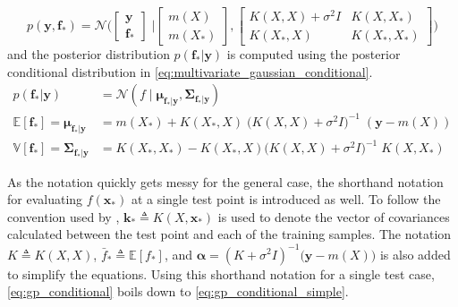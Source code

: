 \begin{equation}
    p(\boldsymbol{y}, \boldsymbol{f}_*) = \mathcal{N}\bigg(\begin{bmatrix}
        \boldsymbol{y} \\ \boldsymbol{f}_*
    \end{bmatrix} \; \bigg| \begin{bmatrix}
        m(X) \\ m(X_*)
    \end{bmatrix},  \begin{bmatrix}
        K(X, X) + \sigma^2 I & K(X, X_*) \\ K(X_*, X) & K(X_*, X_*)
    \end{bmatrix}\bigg)
\end{equation}
and the posterior distribution $p(\boldsymbol{f}_* | \boldsymbol{y})$ is computed using the posterior conditional distribution in \cref{eq:multivariate_gaussian_conditional}.
\begin{subequations}\label{eq:gp_conditional}
\begin{align}
    p(\boldsymbol{f}_* | \boldsymbol{y}) &= \mathcal{N}(f \; | \; \boldsymbol{\mu}_{\boldsymbol{f}_*|\boldsymbol{y}}, \boldsymbol{\Sigma}_{\boldsymbol{f}_*|\boldsymbol{y}})\\
    \mathbb{E}[\boldsymbol{f}_*] =  \boldsymbol{\mu}_{\boldsymbol{f}_* | \boldsymbol{y}} &= m(X_*) + K(X_*, X) \; \big(K(X, X) + \sigma^2 I\big)^{-1} \; (\boldsymbol{y} - m(X))\label{eq:gp_conditional_mean}\\
    \mathbb{V}[\boldsymbol{f}_*] = \boldsymbol{\Sigma}_{\boldsymbol{f}_* | \boldsymbol{y}} &= K(X_*, X_*) - K(X_*, X)  \big(K(X, X) + \sigma^2 I\big)^{-1} \; K(X, X_*)\label{eq:gp_conditional_var}
\end{align}
\end{subequations}

As the notation quickly gets messy for the general case, the shorthand notation for evaluating $f(\boldsymbol{x}_*)$ at a single test point is introduced as well. To follow the convention used by \cite{rasmussen}, $\boldsymbol{k}_* \triangleq K(X, \boldsymbol{x}_*)$ is used to denote the vector of covariances calculated between the test point and each of the training samples. The notation $K \triangleq K(X, X)$, $\bar{f}_* \triangleq \mathbb{E}[f_*]$, and $\boldsymbol{\alpha} = (K + \sigma^2 I)^{-1} \big(\boldsymbol{y} - m(X)\big)$ is also added to simplify the equations. Using this shorthand notation for a single test case, \cref{eq:gp_conditional} boils down to \cref{eq:gp_conditional_simple}.

